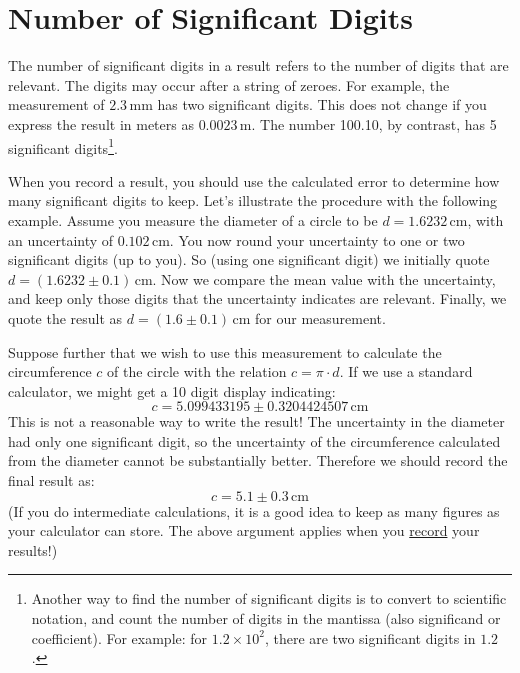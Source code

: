 \documentclass[letterpaper, 12pt]{book}
\begin{document}
\section{Number of Significant Digits}

The number of significant digits in a result refers to the number of digits that are relevant. The digits may occur after a string of zeroes. For example, the measurement of $2.3\,\mathrm{mm}$ has two significant digits. This does not change if you express the result in meters as $0.0023\,\mathrm{m}$. The number 100.10, by contrast, has 5 significant digits\footnote{Another way to find the number of significant digits is to convert to scientific notation, and count the number of digits in the mantissa (also significand or coefficient). For example: for $1.2\times 10^{2}$, there are two significant digits in $1.2$. }.

When you record a result, you should use the calculated error to determine how many significant digits to keep. Let's illustrate the procedure with the following example. Assume you measure the diameter of a circle to be $d = 1.6232\,\mathrm{cm}$, with an uncertainty of $0.102\,\mathrm{cm}$. You now round your uncertainty to one or two significant digits (up to you). So (using one significant digit) we initially quote $d = (1.6232 \pm 0.1)\,\mathrm{cm}$. Now we compare the mean value with the uncertainty, and keep only those digits that the uncertainty indicates are relevant. Finally, we quote the result as $d = (1.6 \pm 0.1)\,\mathrm{cm}$ for our measurement.

Suppose further that we wish to use this measurement to calculate the circumference $c$ of the circle with the relation $c = \pi\cdot d$. If we use a standard calculator, we might get a 10 digit display indicating:
\begin{equation}
    c = 5.099433195\pm 0.3204424507\,\mathrm{cm}
\end{equation}
This is not a reasonable way to write the result!  The uncertainty in the diameter had only one significant digit, so the uncertainty of the circumference calculated from the diameter cannot be substantially better. Therefore we should record the final result as:
\begin{equation}
    c = 5.1\pm 0.3\,\mathrm{cm}
\end{equation}
(If you do intermediate calculations, it is a good idea to keep as many figures as your calculator can store. The above argument applies when you \underline{record} your results!)
\end{document}
